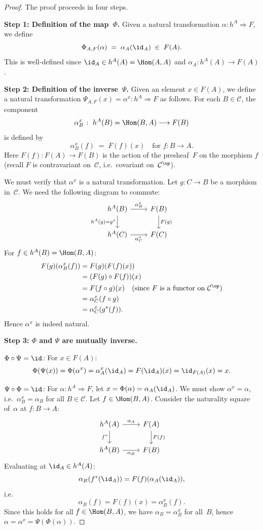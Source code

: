 \begin{proof}
The proof proceeds in four steps.

\medskip\noindent
\textbf{Step 1: Definition of the map~$\Phi$.}
Given a natural transformation $\alpha\colon h^A\Rightarrow F$,
we define
\[
    \Phi_{A,F}(\alpha) \;=\; \alpha_A(\id_A) \;\in\; F(A).
\]
This is well-defined since $\id_A\in h^A(A) = \Hom(A,A)$
and $\alpha_A\colon h^A(A)\to F(A)$.

\medskip\noindent
\textbf{Step 2: Definition of the inverse~$\Psi$.}
Given an element $x\in F(A)$, we define a natural transformation
$\Psi_{A,F}(x) = \alpha^x\colon h^A\Rightarrow F$ as follows.
For each $B\in\mathcal{C}$, the component
\[
    \alpha^x_B \;\colon\; h^A(B) = \Hom(B,A) \longrightarrow F(B)
\]
is defined by
\[
    \alpha^x_B(f) \;=\; F(f)(x) \quad\text{for } f\colon B\to A.
\]
Here $F(f)\colon F(A)\to F(B)$ is the action of the presheaf~$F$ on
the morphism $f$ (recall $F$ is contravariant on~$\mathcal{C}$, i.e.\
covariant on~$\mathcal{C}^{\op}$).

We must verify that $\alpha^x$ is a natural transformation.  Let
$g\colon C\to B$ be a morphism in~$\mathcal{C}$.  We need the following
diagram to commute:
\[
\begin{tikzcd}
h^A(B) \arrow[r, "\alpha^x_B"] \arrow[d, "h^A(g) = g^*"'] &
F(B) \arrow[d, "F(g)"] \\
h^A(C) \arrow[r, "\alpha^x_C"'] &
F(C)
\end{tikzcd}
\]
For $f\in h^A(B) = \Hom(B,A)$:
\begin{align*}
    F(g)(\alpha^x_B(f))
    &= F(g)(F(f)(x)) \\
    &= (F(g)\circ F(f))(x) \\
    &= F(f\circ g)(x) \quad\text{(since $F$ is a functor on $\mathcal{C}^{\op}$)}\\
    &= \alpha^x_C(f\circ g) \\
    &= \alpha^x_C(g^*(f)).
\end{align*}
Hence $\alpha^x$ is indeed natural.

\medskip\noindent
\textbf{Step 3: $\Phi$ and $\Psi$ are mutually inverse.}

\emph{$\Phi\circ\Psi = \id$:}
For $x\in F(A)$:
\[
    \Phi(\Psi(x)) = \Phi(\alpha^x) = \alpha^x_A(\id_A)
    = F(\id_A)(x) = \id_{F(A)}(x) = x.
\]

\emph{$\Psi\circ\Phi = \id$:}
For $\alpha\colon h^A\Rightarrow F$, let $x = \Phi(\alpha) = \alpha_A(\id_A)$.
We must show $\alpha^x = \alpha$, i.e.\ $\alpha^x_B = \alpha_B$ for
all $B\in\mathcal{C}$.  Let $f\in\Hom(B,A)$.  Consider the naturality
square of~$\alpha$ at $f\colon B\to A$:
\[
\begin{tikzcd}
h^A(A) \arrow[r, "\alpha_A"] \arrow[d, "f^*"'] &
F(A) \arrow[d, "F(f)"] \\
h^A(B) \arrow[r, "\alpha_B"'] &
F(B)
\end{tikzcd}
\]
Evaluating at $\id_A \in h^A(A)$:
\[
    \alpha_B(f^*(\id_A)) = F(f)(\alpha_A(\id_A)),
\]
i.e.\
\[
    \alpha_B(f) = F(f)(x) = \alpha^x_B(f).
\]
Since this holds for all $f\in\Hom(B,A)$, we have $\alpha_B = \alpha^x_B$
for all~$B$, hence $\alpha = \alpha^x = \Psi(\Phi(\alpha))$.


\end{proof}
